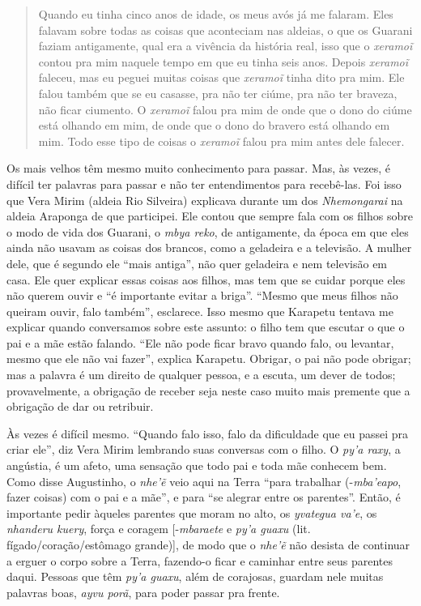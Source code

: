 \begin{quotation}
Quando eu tinha cinco anos de idade, os meus avós já me falaram. Eles
falavam sobre todas as coisas que aconteciam nas aldeias, o que os
Guarani faziam antigamente, qual era a vivência da história real, isso
que o \emph{xeramoĩ} contou pra mim naquele tempo em que eu tinha seis
anos. Depois \emph{xeramoĩ} faleceu, mas eu peguei muitas coisas que
\emph{xeramoĩ} tinha dito pra mim. Ele falou também que se eu casasse, pra
não ter ciúme, pra não ter braveza, não ficar ciumento. O \emph{xeramoĩ}
falou pra mim de onde que o dono do ciúme está olhando em mim, de onde
que o dono do bravero está olhando em mim. Todo esse tipo de coisas o
\emph{xeramoĩ} falou pra mim antes dele falecer.
\end{quotation}

Os mais velhos têm mesmo muito conhecimento para passar. Mas, às vezes, é
difícil ter palavras para passar e não ter entendimentos para
recebê-las. Foi isso que Vera Mirim (aldeia Rio Silveira) explicava
durante um dos \emph{Nhemongarai} na aldeia Araponga de que participei. Ele
contou que sempre fala com os filhos sobre o modo de vida dos Guarani,
o \emph{mbya reko}, de antigamente, da época em que eles ainda não usavam as
coisas dos brancos, como a geladeira e a televisão. A mulher dele, que
é segundo ele ``mais antiga'', não quer geladeira e nem televisão em
casa. Ele quer explicar essas coisas aos filhos, mas tem que se cuidar
porque eles não querem ouvir e ``é importante evitar a briga''. ``Mesmo
que meus filhos não queiram ouvir, falo também'', esclarece. Isso mesmo
que Karapetu tentava me explicar quando conversamos sobre este assunto:
o filho tem que escutar o que o pai e a mãe estão falando. ``Ele não
pode ficar bravo quando falo, ou levantar, mesmo que ele não vai
fazer'', explica Karapetu. Obrigar, o pai não pode obrigar; mas a
palavra é um direito de qualquer pessoa, e a escuta, um dever de todos;
provavelmente, a obrigação de receber seja neste caso muito mais
premente que a obrigação de dar ou retribuir. 

Às vezes é difícil mesmo. ``Quando falo isso, falo da dificuldade que eu
passei pra criar ele'', diz Vera Mirim lembrando suas conversas com o
filho. O \emph{py’a raxy}, a angústia, é um afeto, uma sensação que todo pai e
toda mãe conhecem bem. Como disse Augustinho, o \emph{nhe’ẽ} veio aqui
na Terra ``para trabalhar (-\emph{mba’eapo}, fazer coisas) com o pai e a mãe'',
e para ``se alegrar entre os parentes''. Então, é importante pedir
àqueles parentes que moram no alto, os \emph{yvategua va’e}, os \emph{nhanderu
kuery}, força e coragem [-\emph{mbaraete} e \emph{py’a guaxu} (lit.
fígado/coração/estômago grande)], de modo que o \emph{nhe’ẽ} não desista
de continuar a erguer o corpo sobre a Terra, fazendo-o ficar e caminhar
entre seus parentes daqui. Pessoas que têm \emph{py’a guaxu}, além de
corajosas, guardam nele muitas palavras boas, \emph{ayvu porã}, para poder
passar pra frente.

